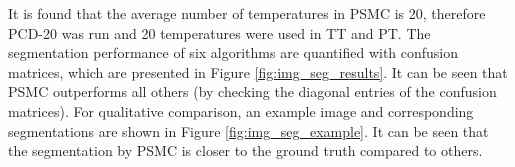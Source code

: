 It is found that the average number of temperatures in PSMC is 20, therefore PCD-20 was run and 20 temperatures were used in TT and PT. The segmentation performance of 
six algorithms are quantified with confusion matrices, which are presented in Figure \ref{fig:img_seg_results}. It can be seen that PSMC outperforms all others (by checking the diagonal 
entries of the confusion matrices).      
For qualitative comparison, an example image and corresponding segmentations are shown in Figure \ref{fig:img_seg_example}.  It can be seen that the segmentation by PSMC is closer to the ground truth 
compared to others. 
\begin{figure}[t!] 
    \centering

\end{figure}
